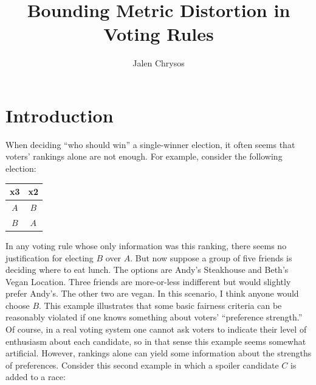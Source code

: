 \documentclass{amsart}
\title{Bounding Metric Distortion in Voting Rules}
\author{Jalen Chrysos}
\begin{document}
\maketitle

\nocite{*}

\begin{abstract}
	
\end{abstract}

\tableofcontents

\newpage 

\section{Introduction}

When deciding ``who should win'' a single-winner election, it often seems that voters' rankings alone are not enough. For example, consider the following election:

\begin{center}
\begin{tabular}{|c|c|}
	\hline 
	x3 & x2\\
	\hline 
	$A$ & $B$\\
	\hline
	$B$ & $A$\\
	\hline
\end{tabular}
\end{center}

In any voting rule whose only information was this ranking, there seems no justification for electing $B$ over $A$. But now suppose a group of five friends is deciding where to eat lunch. The options are Andy's Steakhouse and Beth's Vegan Location. Three friends are more-or-less indifferent but would slightly prefer Andy's. The other two are vegan. In this scenario, I think anyone would choose $B$. This example illustrates that some basic fairness criteria can be reasonably violated if one knows something about voters' ``preference strength.''\\

Of course, in a real voting system one cannot ask voters to indicate their level of enthusiasm about each candidate, so in that sense this example seems somewhat artificial. However, rankings alone can yield some information about the strengths of preferences. Consider this second example in which a spoiler candidate $C$ is added to a race:
\end{document}
